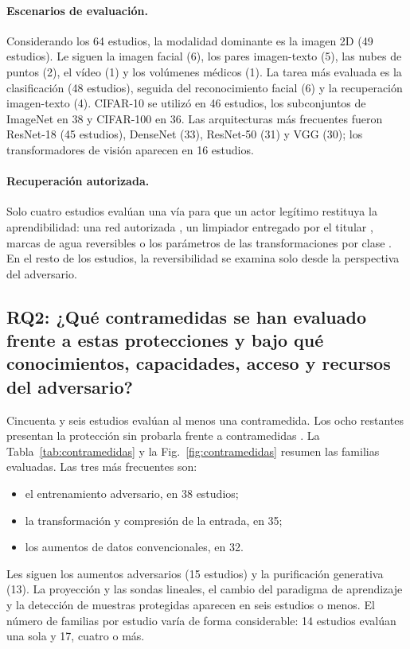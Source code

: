 \paragraph{Escenarios de evaluación.} Considerando los 64 estudios, la modalidad dominante es la imagen 2D (49 estudios). Le siguen la imagen facial (6), los pares imagen-texto (5), las nubes de puntos (2), el vídeo (1) y los volúmenes médicos (1). La tarea más evaluada es la clasificación (48 estudios), seguida del reconocimiento facial (6) y la recuperación imagen-texto (4). CIFAR-10 se utilizó en 46 estudios, los subconjuntos de ImageNet en 38 y CIFAR-100 en 36. Las arquitecturas más frecuentes fueron ResNet-18 (45 estudios), DenseNet (33), ResNet-50 (31) y VGG (30); los transformadores de visión aparecen en 16 estudios.

\paragraph{Recuperación autorizada.} Solo cuatro estudios evalúan una vía para que un actor legítimo restituya la aprendibilidad: una red autorizada \cite{S0030}, un limpiador entregado por el titular \cite{S0066}, marcas de agua reversibles \cite{S0107} o los parámetros de las transformaciones por clase \cite{S0148}. En el resto de los estudios, la reversibilidad se examina solo desde la perspectiva del adversario.

\subsection{RQ2: ¿Qué contramedidas se han evaluado frente a estas protecciones y bajo qué conocimientos, capacidades, acceso y recursos del adversario?}\label{sec:rq2}

Cincuenta y seis estudios evalúan al menos una contramedida. Los ocho restantes presentan la protección sin probarla frente a contramedidas \cite{S0020,S0066,S0101,S0124,S0143,S0151,S0154,S0202}. La Tabla~\ref{tab:contramedidas} y la Fig.~\ref{fig:contramedidas} resumen las familias evaluadas. Las tres más frecuentes son:
\begin{itemize}
\item el entrenamiento adversario, en 38 estudios;
\item la transformación y compresión de la entrada, en 35;
\item los aumentos de datos convencionales, en 32.
\end{itemize}
Les siguen los aumentos adversarios (15 estudios) y la purificación generativa (13). La proyección y las sondas lineales, el cambio del paradigma de aprendizaje y la detección de muestras protegidas aparecen en seis estudios o menos. El número de familias por estudio varía de forma considerable: 14 estudios evalúan una sola y 17, cuatro o más.

